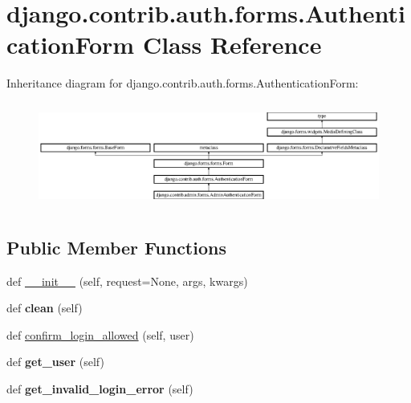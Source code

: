 \hypertarget{classdjango_1_1contrib_1_1auth_1_1forms_1_1_authentication_form}{}\section{django.\+contrib.\+auth.\+forms.\+Authentication\+Form Class Reference}
\label{classdjango_1_1contrib_1_1auth_1_1forms_1_1_authentication_form}
Inheritance diagram for django.\+contrib.\+auth.\+forms.\+Authentication\+Form\+:\begin{figure}[H]
\begin{center}
\leavevmode
\includegraphics[height=3.489097cm]{classdjango_1_1contrib_1_1auth_1_1forms_1_1_authentication_form}
\end{center}
\end{figure}
\subsection*{Public Member Functions}
\begin{DoxyCompactItemize}
\item 
def \mbox{\hyperlink{classdjango_1_1contrib_1_1auth_1_1forms_1_1_authentication_form_a5dd36c3ebb53a55181e4f4e181990213}{\+\_\+\+\_\+init\+\_\+\+\_\+}} (self, request=None, args, kwargs)
\item 
\mbox{\label{classdjango_1_1contrib_1_1auth_1_1forms_1_1_authentication_form_a7582ce605c846d85757b967f54ebbb3b}} 
def {\bfseries clean} (self)
\item 
def \mbox{\hyperlink{classdjango_1_1contrib_1_1auth_1_1forms_1_1_authentication_form_ab6ff6af31835bca7456c853853931809}{confirm\+\_\+login\+\_\+allowed}} (self, user)
\item 
\mbox{\label{classdjango_1_1contrib_1_1auth_1_1forms_1_1_authentication_form_a1d47bfa658d8e8d14d3d88ae973607d6}} 
def {\bfseries get\+\_\+user} (self)
\item 
\mbox{\label{classdjango_1_1contrib_1_1auth_1_1forms_1_1_authentication_form_a40a3ba5cd5de2e05a048b61d4783cf15}} 
def {\bfseries get\+\_\+invalid\+\_\+login\+\_\+error} (self)
\end{DoxyCompactItemize}

